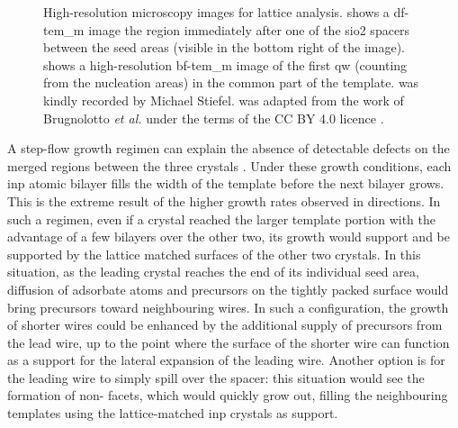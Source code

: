 \begin{figure}
{
    }
    \caption[High-resolution microscopy images for the lattice analysis of the merge structures.]{High-resolution microscopy images for lattice analysis.  shows a \acs{df}-\acs{tem_m} image the region immediately after one of the \acs{sio2} spacers between the seed areas (visible in the bottom right of the image).  shows a high-resolution \acs{bf}-\acs{tem_m} image of the first \acl{qw} (counting from the nucleation areas) in the common part of the template.  was kindly recorded by Michael Stiefel.  was adapted from the work of Brugnolotto \textit{et al.} \cite{Brugnolotto2023_2} under the terms of the CC BY 4.0 licence \cite{CCBY40}.}
    \label{fig:merge_high-res}
\end{figure}

A step-flow growth regimen can explain the absence of detectable defects on the merged regions between the three crystals \cite{Brugnolotto2023_2}. Under these growth conditions, each \acs{inp} atomic bilayer fills the width of the template before the next bilayer grows. This is the extreme result of the higher growth rates observed in  directions. In such a regimen, even if a crystal reached the larger template portion with the advantage of a few bilayers over the other two, its growth would support and be supported by the lattice matched  surfaces of the other two crystals. In this situation, as the leading crystal reaches the end of its individual seed area, diffusion of adsorbate atoms and precursors on the tightly packed  surface would bring precursors toward neighbouring wires. In such a configuration, the growth of shorter wires could be enhanced by the additional supply of precursors from the lead wire, up to the point where the  surface of the shorter wire can function as a support for the lateral expansion of the leading wire. Another option is for the leading wire to simply spill over the spacer: this situation would see the formation of non- facets, which would quickly grow out, filling the neighbouring templates using the lattice-matched \acs{inp} crystals as support.

